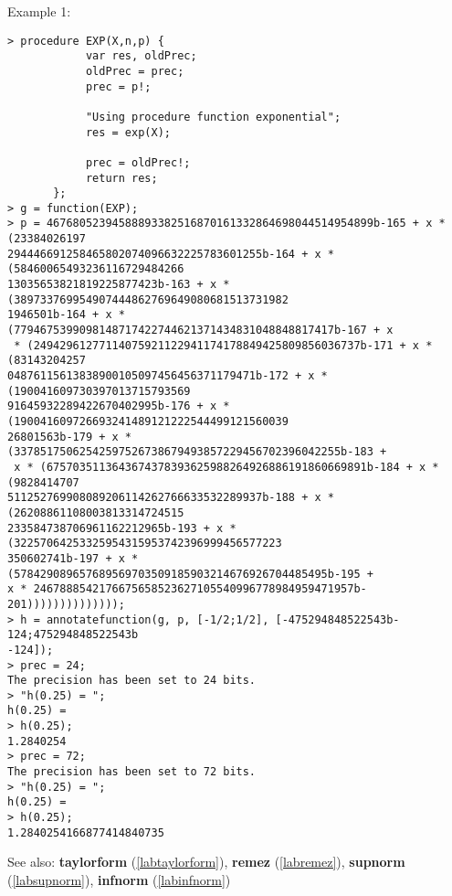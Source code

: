 \noindent Example 1: 
\begin{center}\begin{minipage}{15cm}\begin{Verbatim}[frame=single]
> procedure EXP(X,n,p) {
            var res, oldPrec;
            oldPrec = prec;
            prec = p!;
            
            "Using procedure function exponential";
            res = exp(X);
            
            prec = oldPrec!;
            return res;
       };
> g = function(EXP);
> p = 46768052394588893382516870161332864698044514954899b-165 + x * (23384026197
294446691258465802074096632225783601255b-164 + x * (58460065493236116729484266
13035653821819225877423b-163 + x * (389733769954907444862769649080681513731982
1946501b-164 + x * (7794675399098148717422744621371434831048848817417b-167 + x
 * (24942961277114075921122941174178849425809856036737b-171 + x * (83143204257
04876115613838900105097456456371179471b-172 + x * (190041609730397013715793569
91645932289422670402995b-176 + x * (190041609726693241489121222544499121560039
26801563b-179 + x * (33785175062542597526738679493857229456702396042255b-183 +
 x * (6757035113643674378393625988264926886191860669891b-184 + x * (9828414707
511252769908089206114262766633532289937b-188 + x * (26208861108003813314724515
233584738706961162212965b-193 + x * (32257064253325954315953742396999456577223
350602741b-197 + x * (578429089657689569703509185903214676926704485495b-195 + 
x * 2467888542176675658523627105540996778984959471957b-201))))))))))))));
> h = annotatefunction(g, p, [-1/2;1/2], [-475294848522543b-124;475294848522543b
-124]);
> prec = 24;
The precision has been set to 24 bits.
> "h(0.25) = ";
h(0.25) = 
> h(0.25);
1.2840254
> prec = 72;
The precision has been set to 72 bits.
> "h(0.25) = ";
h(0.25) = 
> h(0.25);
1.2840254166877414840735
\end{Verbatim}
\end{minipage}\end{center}
See also: \textbf{taylorform} (\ref{labtaylorform}), \textbf{remez} (\ref{labremez}), \textbf{supnorm} (\ref{labsupnorm}), \textbf{infnorm} (\ref{labinfnorm})
